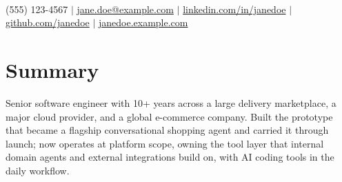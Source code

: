 \documentclass[letterpaper,10pt]{article}
\begin{document}
\begin{center}
  \textbf{\huge \color{maincolor}{Jane Doe}} \\ \vspace{2pt}
  \small (555) 123-4567 $|$
  \href{mailto:jane.doe@example.com}{jane.doe@example.com} $|$
  \href{https://linkedin.com/in/janedoe}{linkedin.com/in/janedoe} $|$
  \href{https://github.com/janedoe}{github.com/janedoe} $|$
  \href{https://janedoe.example.com}{janedoe.example.com}
\end{center}

\section{Summary}
Senior software engineer with 10+ years across a large delivery marketplace, a major cloud provider, and a global e-commerce company. Built the prototype that became a flagship conversational shopping agent and carried it through launch; now operates at platform scope, owning the tool layer that internal domain agents and external integrations build on, with AI coding tools in the daily workflow.

\end{document}
